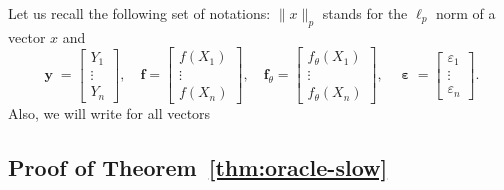 \documentclass[
	fontsize=11pt, %
	twoside=false, %
	numbers=noenddot, %
]{kaobook}
\renewcommand{\bf}{{\boldsymbol f}}
\DeclareMathOperator{\by}{{\boldsymbol y}}
\DeclareMathOperator{\beps}{\boldsymbol \varepsilon}
\newcommand{\eps}{\varepsilon}
\newcommand{\norm}[1]{\| #1 \|}
\begin{document}
Let us recall the following set of notations: $\norm{x}_p$ stands for the $\ell_p$ norm of a vector $x$ and
\begin{equation*}
	\by =
	\begin{bmatrix}
		Y_1 \\
		\vdots \\
		Y_n
	\end{bmatrix},
	\quad
	\bf = 
	\begin{bmatrix}
		f(X_1) \\
		\vdots \\
		f(X_n)
	\end{bmatrix},
	\quad
	\bf_\theta =	
	\begin{bmatrix}
		f_\theta(X_1) \\
		\vdots \\
		f_\theta(X_n)
	\end{bmatrix},
	\quad
	\beps = 
	\begin{bmatrix}
		\eps_1 \\
		\vdots \\
		\eps_n
	\end{bmatrix}.
\end{equation*}
Also, we will write  for all vectors

\subsection{Proof of Theorem~\ref{thm:oracle-slow}} %
\label{sub:proof_of_theorem_thm:oracle-slow}
\end{document}
